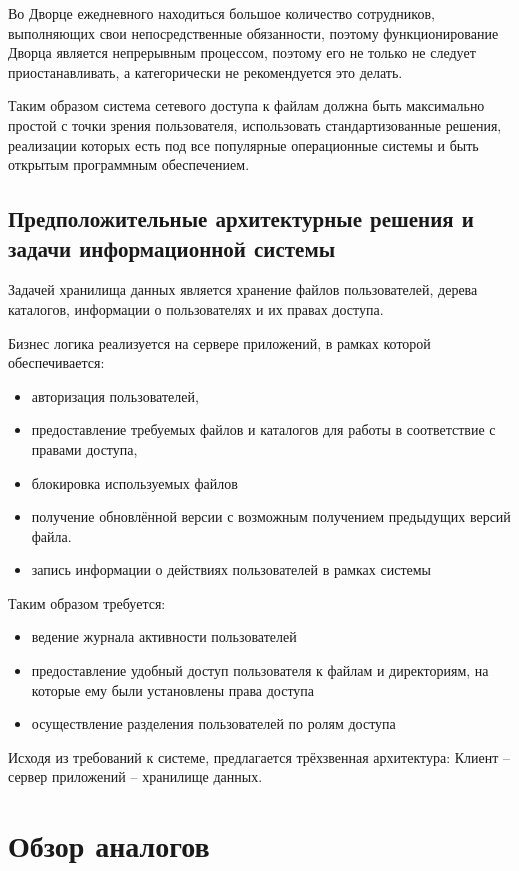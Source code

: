 \documentclass[utf8,usehyperref,12pt]{G7-32}
\begin{document}
Во Дворце ежедневного находиться большое количество сотрудников, выполняющих свои непосредственные обязанности, поэтому функционирование Дворца является непрерывным процессом, поэтому его не только не следует приостанавливать,
а категорически не рекомендуется это делать.

Таким образом система сетевого доступа к файлам должна быть максимально простой с точки зрения пользователя, использовать стандартизованные решения, реализации которых есть под все популярные операционные системы и быть открытым программным обеспечением.

\subsection{Предположительные архитектурные решения и задачи информационной системы}
Задачей хранилища данных является хранение файлов пользователей, дерева каталогов, информации о пользователях и их правах доступа.

Бизнес логика реализуется на сервере приложений, в рамках которой обеспечивается:
\begin{itemize}

\item авторизация пользователей, 
\item предоставление требуемых файлов и каталогов для работы в соответствие с правами доступа, 
\item блокировка используемых файлов 
\item получение обновлённой версии с возможным получением предыдущих версий файла.
\item запись информации о действиях пользователей в рамках системы
 \end{itemize}

Таким образом требуется:
\begin{itemize}
\item ведение журнала активности пользователей
\item предоставление удобный доступ пользователя к файлам и директориям, на которые ему были установлены права доступа
\item осуществление разделения пользователей по ролям доступа
\end{itemize}

Исходя из требований к системе, предлагается трёхзвенная архитектура: Клиент -- сервер приложений -- хранилище данных.

\section{Обзор аналогов}
\end{document}

